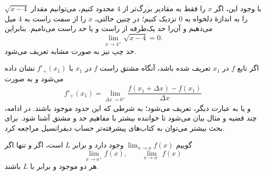  با وجود این، اگر $x$ را فقط به مقادیر بزرگ‌تر از $4$ محدود کنیم، می‌توانیم مقدار $\sqrt{x-4}$
را به اندازهٔ دلخواه به $0$ نزدیک کنیم؛ 
در چنین حالتی، $x$ را از سمت راست به $4$ میل می‌دهیم و آن‌را حد یک‌طرفه از راست و یا حد راست می‌نامیم. بنابراین
\[
\lim_{x\rightarrow 4^{+}}\sqrt{x-4}=0.
\]
حد چپ نیز به صورت مشابه تعریف می‌شود.


اگر تابع $f$ در $x_1$ تعریف شده باشد، آنگاه مشتق راست $f$ در $x_1$ با $f'_{+}(x_1)$ 
نشان داده می‌شود و به صورت 
\begin{align}
f'_{+}(x_1)=\lim_{\Delta x\rightarrow 0^{+}}\dfrac{f(x_1+\Delta x) - f(x_1)}{\Delta x}
\end{align}
و یا به عبارت دیگر،
تعریف می‌شود؛ به شرطی که این حدود موجود باشند.
در ادامه، چند قضیه و مثال بیان می‌شود تا خواننده بیشتر با مفاهیم حد و مشتق آشنا
شود. برای بحث بیشتر می‌توان به کتاب‌های پیشرفته‌تر حساب دیفرانسیل مراجعه کرد. 

\begin{ptheorem1}[وجود حد]\label{bth1}
گوییم $\lim_{x\rightarrow a}f(x)$ وجود دارد و برابر $L$ است،  اگر و تنها اگر 
\[
\lim_{x\rightarrow a^{+}}f(x),\qquad \lim_{x\rightarrow a^{-}}f(x)
\]
هر دو موجود و برابر با $L$ باشند.
\end{ptheorem1}

